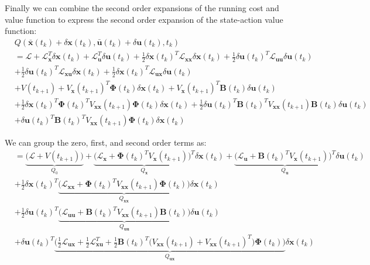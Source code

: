 \documentclass[11pt]{homework}
\renewcommand{\vec}[1]{\ensuremath{\boldsymbol{#1}}}
\begin{document}
\begin{arabicparts}
			
			\newpage 
		Finally we can combine the second order expansions of the running cost and value function to express the second order expansion of the state-action value function: 
			\begin{align*}
				& Q(\bar{\vec{x}}(t_{k}) + \delta \vec{x}(t_{k}), \bar{\vec{u}}(t_{k}) + \delta \vec{u}(t_{k}), t_{k}) \\
				& = \mathcal{L} + \mathcal{L}_{\vec{x}}^{T}\delta\vec{x}(t_{k}) + \mathcal{L}_{\vec{u}}^{T}\delta\vec{u}(t_{k}) + \frac{1}{2}\delta\vec{x}(t_{k})^{T}\mathcal{L}_{\vec{xx}}\delta\vec{x}(t_{k}) + \frac{1}{2}\delta\vec{u}(t_{k})^{T}\mathcal{L}_{\vec{uu}}\delta\vec{u}(t_{k}) \\
				& + \frac{1}{2}\delta\vec{u}(t_{k})^{T}\mathcal{L}_{\vec{xu}}\delta\vec{x}(t_{k}) + \frac{1}{2}\delta\vec{x}(t_{k})^{T}\mathcal{L}_{\vec{ux}}\delta\vec{u}(t_{k}) \\
				& + V(t_{k+1}) + V_{\vec{x}}(t_{k+1})^{T}\vec{\Phi}(t_{k})\delta\vec{x}(t_{k}) +  V_{\vec{x}}(t_{k+1})^{T}\vec{B}(t_{k})\delta\vec{u}(t_{k}) \\
				& + \frac{1}{2}\delta\vec{x}(t_{k})^{T}\vec{\Phi}(t_{k})^{T}V_{\vec{xx}}(t_{k+1})\vec{\Phi}(t_{k})\delta\vec{x}(t_{k}) + \frac{1}{2}\delta\vec{u}(t_{k})^{T}\vec{B}(t_{k})^{T}V_{\vec{xx}}(t_{k+1})\vec{B}(t_{k})\delta\vec{u}(t_{k}) \\
				& + \delta\vec{u}(t_{k})^{T}\vec{B}(t_{k})^{T}V_{\vec{xx}}(t_{k+1})\vec{\Phi}(t_{k})\delta\vec{x}(t_{k})
			\end{align*}
	
		We can group the zero, first, and second order terms as: 
			\begin{align*}
				& = \underbrace{\Big(\mathcal{L} +  V(t_{k+1})  \Big)}_{Q_{0}} + \underbrace{\Big(\mathcal{L}_{\vec{x}} + \vec{\Phi}(t_{k})^{T}V_{\vec{x}}(t_{k+1}) \Big)^{T}}_{Q_{\vec{x}}}\delta\vec{x}(t_{k})  + \underbrace{\Big(\mathcal{L}_{\vec{u}} + \vec{B}(t_{k})^{T}V_{\vec{x}}(t_{k+1})\Big)^{T}}_{Q_{\vec{u}}}\delta\vec{u}(t_{k}) \\
				& + \frac{1}{2}\delta\vec{x}(t_{k})^{T}\underbrace{\Big( \mathcal{L}_{\vec{xx}} + \vec{\Phi}(t_{k})^{T}V_{\vec{xx}}(t_{k+1})\vec{\Phi}(t_{k})\Big)}_{Q_{\vec{xx}}}\delta\vec{x}(t_{k}) \\
				& + \frac{1}{2}\delta\vec{u}(t_{k})^{T}\underbrace{\Big(\mathcal{L}_{\vec{uu}} + \vec{B}(t_{k})^{T}V_{\vec{xx}}(t_{k+1})\vec{B}(t_{k})\Big)}_{Q_{\vec{uu}}}\delta\vec{u}(t_{k}) \\
				& + \delta\vec{u}(t_{k})^{T}\underbrace{\Bigg( \frac{1}{2}\mathcal{L}_{\vec{ux}} + \frac{1}{2}\mathcal{L}_{\vec{xu}}^{T} + \frac{1}{2}\vec{B}(t_{k})^{T}\Big(V_{\vec{xx}}(t_{k+1}) + V_{\vec{xx}}(t_{k+1})^{T}\Big) \vec{\Phi}(t_{k})\Bigg)}_{Q_{\vec{ux}}}\delta\vec{x}(t_{k})
			\end{align*}
		

\end{arabicparts}
\end{document}
